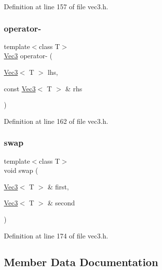 Definition at line 157 of file vec3.\+h.

\mbox{\label{class_vec3_acf4273db43751acb5347ab35a971387d}} 
\subsubsection{\texorpdfstring{operator-\/}{operator-}}
{\footnotesize\ttfamily template$<$class T$>$ \\
\mbox{\hyperlink{class_vec3}{Vec3}} operator-\/ (\begin{DoxyParamCaption}\item[{\mbox{\hyperlink{class_vec3}{Vec3}}$<$ T $>$}]{lhs,  }\item[{const \mbox{\hyperlink{class_vec3}{Vec3}}$<$ T $>$ \&}]{rhs }\end{DoxyParamCaption})\hspace{0.3cm}{\ttfamily [friend]}}



Definition at line 162 of file vec3.\+h.

\mbox{\label{class_vec3_ab0da0dbcf5bf321872155851732ffc2f}} 
\subsubsection{\texorpdfstring{swap}{swap}}
{\footnotesize\ttfamily template$<$class T$>$ \\
void swap (\begin{DoxyParamCaption}\item[{\mbox{\hyperlink{class_vec3}{Vec3}}$<$ T $>$ \&}]{first,  }\item[{\mbox{\hyperlink{class_vec3}{Vec3}}$<$ T $>$ \&}]{second }\end{DoxyParamCaption})\hspace{0.3cm}{\ttfamily [friend]}}



Definition at line 174 of file vec3.\+h.



\subsection{Member Data Documentation}
\mbox{\label{class_vec3_ad6cc034d7eca8bb25a752db1c7a11c1a}} 
